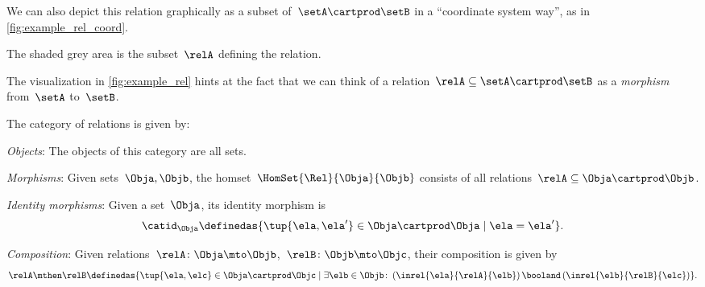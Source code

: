 We can also depict this relation graphically as a subset of~$\setA \cartprod \setB$ in a ``coordinate system way'', as in \cref{fig:example_rel_coord}.

The shaded grey area is the subset~$\relA$ defining the relation.


The visualization in \cref{fig:example_rel} hints at the fact that we can think of a relation~$\relA \subseteq \setA \cartprod \setB$ as a \emph{morphism} from~$\setA$ to~$\setB$.


\begin{ctdefinition}
    \label{def:Rel}
    The category of relations \iindex{\Rel}  is given by:
    \begin{compactenum}
        \item \emph{Objects}: The objects of this category are all sets.
        \item \emph{Morphisms}: Given sets~$\Obja, \Objb$, the homset~$\HomSet{\Rel}{\Obja}{\Objb}$ consists of all
        relations~$\relA\subseteq \Obja\cartprod \Objb$.
        \item \emph{Identity morphisms}: Given a set~$\Obja$, its identity morphism is
        \begin{equation}
            \catid_\Obja \definedas \{ \tup{\ela,\ela'} \in \Obja \cartprod \Obja \mid  \ela = \ela' \}.
        \end{equation}
        \item \emph{Composition}: Given relations~$\relA \colon \Obja\mto \Objb$,~$\relB \colon \Objb\mto \Objc$, their composition is given by
        \begin{equation}
            \label{eq:RelCompRule}
            \relA \mthen \relB \definedas \{\tup{\ela,\elc} \in \Obja \cartprod \Objc \mid  \exists \elb \in \Objb \colon \left(\inrel{\ela}{\relA}{\elb} \right) \booland \left(\inrel{\elb}{\relB}{\elc}\right)\}.
        \end{equation}
    \end{compactenum}
\end{ctdefinition}


